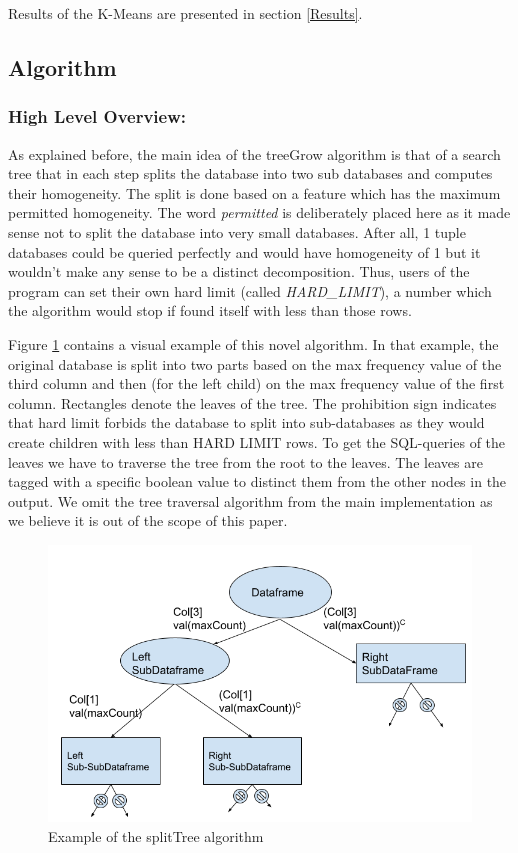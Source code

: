 \documentclass[sigconf]{acmart}
\begin{document}
Results of the K-Means are presented in section \ref{Results}.




\subsection{Algorithm}\label{OurAlgorithm}
\subsubsection{High Level Overview:}
As explained before, the main idea of the treeGrow algorithm is that of a search tree that in each step splits the database into two sub databases and computes their homogeneity. The split is done based on a feature which has the maximum permitted homogeneity. The word \textit{permitted} is deliberately placed here as it made sense not to split the database into very small databases. After all, 1 tuple databases could be queried perfectly and would have homogeneity of 1 but it wouldn't make any sense to be a distinct decomposition. Thus, users of the program can set their own hard limit (called \textit{HARD\_LIMIT}),  a number which the algorithm would stop if found itself with less than those rows.

Figure \ref{fig:ourAlgoExample} contains a visual example of this novel algorithm. In that example, the original database is split into two parts based on the max frequency value of the third column and then (for the left child) on the max frequency value of the first column. Rectangles denote the leaves of the tree. The prohibition sign indicates that hard limit forbids the database to split into sub-databases as they would create children with less than HARD LIMIT rows. To get the SQL-queries of the leaves we have to traverse the tree from the root to the leaves. The leaves are tagged with a specific boolean value to distinct them from the other nodes in the output. We omit the tree traversal algorithm from the main implementation as we believe it is out of the scope of this paper. 


\begin{figure}[h!]
    \centering
    \includegraphics[scale=0.36]{images/TreeFigure.png}
    \caption{Example of the splitTree algorithm}
    \label{fig:ourAlgoExample}
\end{figure}
\end{document}

